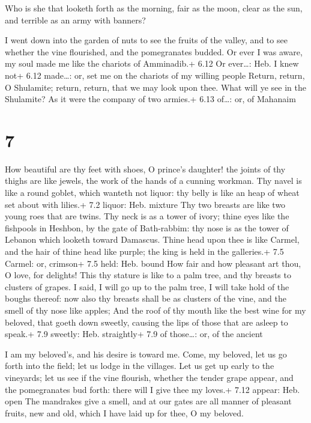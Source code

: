  Who is she that looketh forth as the morning, fair as
the moon, clear as the sun, and terrible as an army with banners?

 I went down into the garden of nuts to see the fruits of
the valley, and to see whether the vine flourished, and the pomegranates
budded.  Or ever I was aware, my soul made me like the
chariots of Amminadib.+ 6.12 Or ever\ldots: Heb. I knew not+ 6.12
made\ldots: or, set me on the chariots of my willing people
 Return, return, O Shulamite; return, return, that we may
look upon thee. What will ye see in the Shulamite? As it were the
company of two armies.+ 6.13 of\ldots: or, of Mahanaim

\hypertarget{section-6}{%
\section{7}\label{section-6}}

 How beautiful are thy feet with shoes, O prince's daughter!
the joints of thy thighs are like jewels, the work of the hands of a
cunning workman.  Thy navel is like a round goblet, which
wanteth not liquor: thy belly is like an heap of wheat set about with
lilies.+ 7.2 liquor: Heb. mixture  Thy two breasts are like
two young roes that are twins.  Thy neck is as a tower of
ivory; thine eyes like the fishpools in Heshbon, by the gate of
Bath-rabbim: thy nose is as the tower of Lebanon which looketh toward
Damascus.  Thine head upon thee is like Carmel, and the hair
of thine head like purple; the king is held in the galleries.+ 7.5
Carmel: or, crimson+ 7.5 held: Heb. bound  How fair and how
pleasant art thou, O love, for delights!  This thy stature
is like to a palm tree, and thy breasts to clusters of grapes.
 I said, I will go up to the palm tree, I will take hold of
the boughs thereof: now also thy breasts shall be as clusters of the
vine, and the smell of thy nose like apples;  And the roof
of thy mouth like the best wine for my beloved, that goeth down sweetly,
causing the lips of those that are asleep to speak.+ 7.9 sweetly: Heb.
straightly+ 7.9 of those\ldots: or, of the ancient

 I am my beloved's, and his desire is toward me.
 Come, my beloved, let us go forth into the field; let us
lodge in the villages.  Let us get up early to the
vineyards; let us see if the vine flourish, whether the tender grape
appear, and the pomegranates bud forth: there will I give thee my
loves.+ 7.12 appear: Heb. open  The mandrakes give a smell,
and at our gates are all manner of pleasant fruits, new and old, which I
have laid up for thee, O my beloved.


